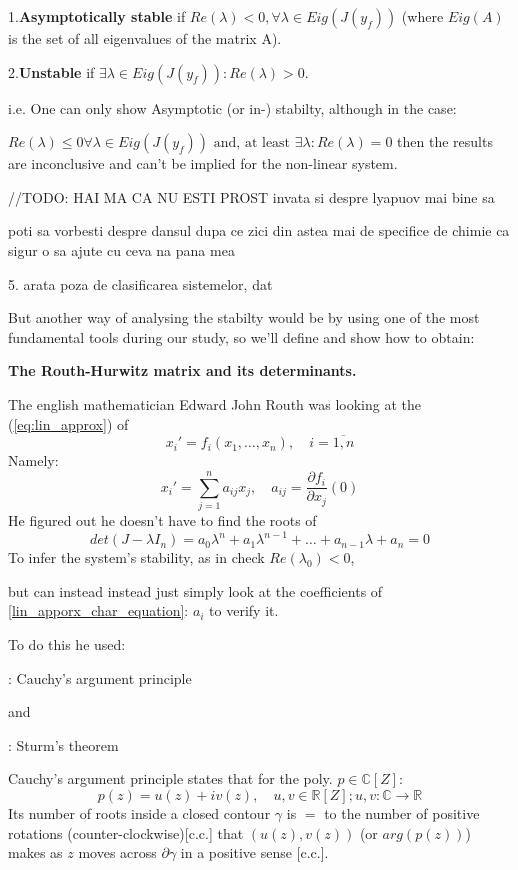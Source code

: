 1.\textbf{Asymptotically stable} if $Re(\lambda) < 0, \forall \lambda \in Eig(J(y_f))$ (where $Eig(A)$ is the set of all eigenvalues of the matrix A).

2.\textbf{Unstable} if $\exists \lambda \in Eig(J(y_f)) : Re(\lambda)> 0$.

i.e. One can only show Asymptotic (or in-) stabilty, although in the case:

$Re(\lambda) \leqslant  0 \forall \lambda \in Eig(J(y_f)) \text{ and,
at least } \exists \lambda : Re(\lambda) = 0$ then the results are
inconclusive and can't be implied for the non-linear system.

\hfill\break
//TODO: HAI MA CA NU ESTI PROST invata si despre lyapuov mai bine sa

poti sa vorbesti despre dansul dupa ce zici din astea mai de
specifice de chimie ca sigur o sa ajute cu ceva na pana mea

5. arata poza de clasificarea sistemelor, dat

\hfill\break
But another way of analysing the stabilty would be by using one of
the most fundamental tools during our study, so we'll define and show
how to obtain:

\textbf{The Routh-Hurwitz matrix and its determinants.}

The english mathematician Edward John Routh was looking at the
(\ref{eq:lin_approx}) of
\[
x_i' = f_i(x_1,\dots , x_n), \quad i = \overline{1,n}
\]
Namely:
\[
x_i' =\sum_{j=1}^{n}a_{ij} x_j, \quad a_{ij} = \frac{\partial
f_i}{\partial x_j}(0)
\]
He figured out he doesn't have to find the roots of
\begin{equation}\label{lin_apporx_char_equation}
det(J - \lambda I_n) = a_0 \lambda^n + a_1 \lambda^{n-1} + \dots +
a_{n-1}\lambda + a_n = 0
\end{equation}
To infer the system's stability, as in check
$ Re(\lambda_0) < 0$,

but can instead instead just simply look at the coefficients of
\ref{lin_apporx_char_equation}: $a_{i}$ to verify it.

To do this he used:

: Cauchy's argument principle

and

: Sturm's theorem


Cauchy's argument principle states that for the poly. $p \in \mathbb{C}[Z]$:
\[
p(z) = u(z) + i v(z), \quad u, v \in \mathbb{R}[Z]; u,v : \mathbb{C}
\rightarrow \mathbb{R}
\]
Its number of roots inside a closed contour $\gamma$  is $=$ to the
number of positive rotations (counter-clockwise)[c.c.] that $(u(z),
v(z))$ (or $arg(p(z))$) makes as $z$ moves across $\partial \gamma$
in a positive sense [c.c.].

